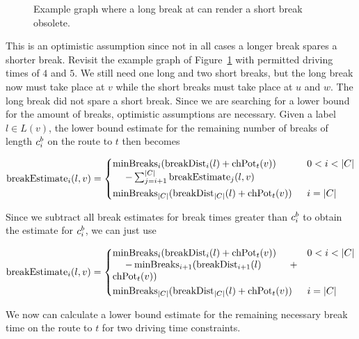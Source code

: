 \begin{figure}[hbtp]
	\centering
	
	\caption{Example graph where a long break at can render a short break obsolete.}
	\label{fig:graph_short_long_break}
\end{figure}

This is an optimistic assumption since not in all cases a longer break spares a shorter break. Revisit the example graph of Figure~\ref{fig:graph_short_long_break} with permitted driving times of $4$ and $5$. We still need one long and two short breaks, but the long break now must take place at $v$ while the short breaks must take place at $u$ and $w$. The long break did not spare a short break. Since we are searching for a lower bound for the amount of breaks, optimistic assumptions are necessary. Given a label $l \in L(v)$, the lower bound estimate for the remaining number of breaks of length $c_i^b$ on the route to $t$ then becomes

\begin{align}\label{eq:number_breaks_sum}
	\breakEstimate_i(l,v)  =\begin{dcases}
		\parbox[t]{.55\textwidth}{$\minBreaks_i(\breakDist_i(l) + \chpotential_t(v))$ \\\phantom{{}=1}$- \sum_{j=i+1}^{|C|}{\breakEstimate_j(l,v)}$} & 0 < i < |C| \\
		\minBreaks_{|C|}(\breakDist_{|C|}(l) + \chpotential_t(v)) & i=|C|
	\end{dcases}
\end{align}

Since we subtract all break estimates for break times greater than $c_i^b$ to obtain the estimate for $c_i^b$, we can just use

\begin{align}\label{eq:break_estimate_n}
	\breakEstimate_i(l,v) = \begin{dcases}
		\parbox[t]{.55\textwidth}{$\minBreaks_i(\breakDist_i(l) + \chpotential_t(v))$ \\\phantom{{}=1}$- \minBreaks_{i+1}(\breakDist_{i+1}(l) + \chpotential_t(v))$} & 0 < i < |C| \\
		\minBreaks_{|C|}(\breakDist_{|C|}(l) + \chpotential_t(v)) & i=|C|
	\end{dcases}
\end{align}

We now can calculate a lower bound estimate for the remaining necessary break time on the route to $t$ for two driving time constraints.


